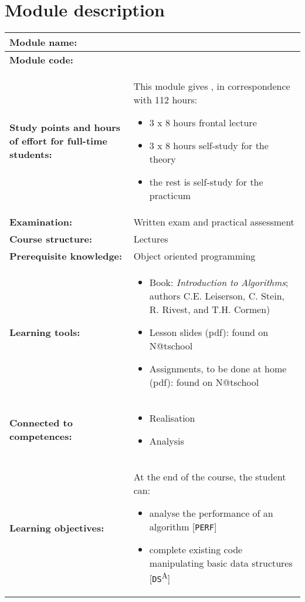 \section*{Module description}
\begin{tabularx}{\textwidth}{|>{\columncolor{lichtGrijs}} p{}|X|}
	\hline
	\textbf{Module name:} & \modulenaam\\
	\hline
	\textbf{Module code: }& \modulecode\\
	\hline
	\textbf{Study points \newline and hours of effort for full-time students:} & This module gives \stdPunten, in correspondence with 112 hours:
	\begin{itemize}
		\item 3 x 8 hours frontal lecture
		\item 3 x 8 hours self-study for the theory
		\item the rest is self-study for the practicum
	\end{itemize} \\
	\hline
	\textbf{Examination:} & Written exam and practical assessment \\
	\hline
	\textbf{Course structure:} & Lectures \\
	\hline
	\textbf{Prerequisite knowledge:} & Object oriented programming \\
	\hline
	\textbf{Learning tools:} & \begin{itemize}
			\item Book: \textit{Introduction to Algorithms}; authors
			C.E. Leiserson, C. Stein, R. Rivest, and T.H. Cormen)
			\item Lesson slides (pdf): found on N@tschool
			\item Assignments, to be done at home (pdf): found on N@tschool
		\end{itemize} \\
	\hline
	\textbf{Connected to \newline competences:} & \begin{itemize}
			\item Realisation
			\item Analysis
		\end{itemize} \\
	\hline
	\textbf{Learning objectives:} &
		At the end of the course, the student can:
			\begin{itemize}
				\item analyse the performance of an algorithm [\texttt{PERF}]
				\item complete existing code manipulating basic data structures [\texttt{DS}\textsuperscript{A}]

\end{itemize}
\end{tabularx}
